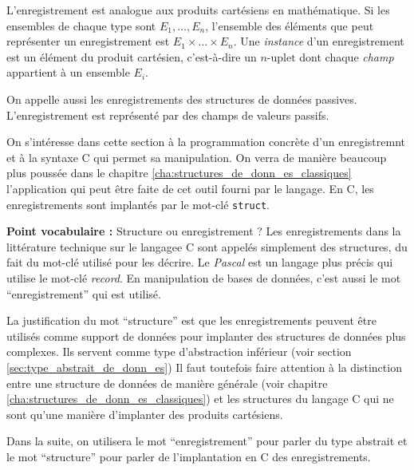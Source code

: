 \documentclass[../../../main.tex]{subfiles}
\begin{document}
L'enregistrement est analogue aux produits cartésiens en mathématique. Si les ensembles de chaque type sont $E_1, \dots, E_n$, l'ensemble des éléments que peut représenter un enregistrement est $E_1\times\dots\times E_n$. Une \textit{instance} d'un enregistrement est un élément du produit cartésien, c'est-à-dire un $n\text{-uplet}$ dont chaque \textit{champ} appartient à un ensemble $E_i$.

On appelle aussi les enregistrements des structures de données passives. L'enregistrement est représenté par des champs de valeurs passifs.

On s'intéresse dans cette section à la programmation concrète d'un enregistremnt et à la syntaxe C qui permet sa manipulation. On verra de manière beaucoup plus poussée dans le chapitre \ref{cha:structures_de_donn_es_classiques} l'application qui peut être faite de cet outil fourni par le langage. En C, les enregistrements sont implantés par le mot-clé \texttt{struct}.

\begin{minitelbasicbox}{\textbf{Point vocabulaire :} Structure ou enregistrement ?}
Les enregistrements dans la littérature technique sur le langagee C sont appelés simplement des structures, du fait du mot-clé utilisé pour les décrire. Le \textit{Pascal} est un langage plus précis qui utilise le mot-clé \textit{record}. En manipulation de bases de données, c'est aussi le mot ``enregistrement'' qui est utilisé.

La justification du mot ``structure'' est que les enregistrements peuvent être utilisés comme support de données pour implanter des structures de données plus complexes. Ils servent comme type d'abstraction inférieur (voir section \ref{sec:type_abstrait_de_donn_es}) Il faut toutefois faire attention à la distinction entre une structure de données de manière générale (voir chapitre \ref{cha:structures_de_donn_es_classiques}) et les structures du langage C qui ne sont qu'une manière d'implanter des produits cartésiens.

Dans la suite, on utilisera le mot ``enregistrement'' pour parler du type abstrait et le mot ``structure'' pour parler de l'implantation en C des enregistrements.
\end{minitelbasicbox}
\end{document}
